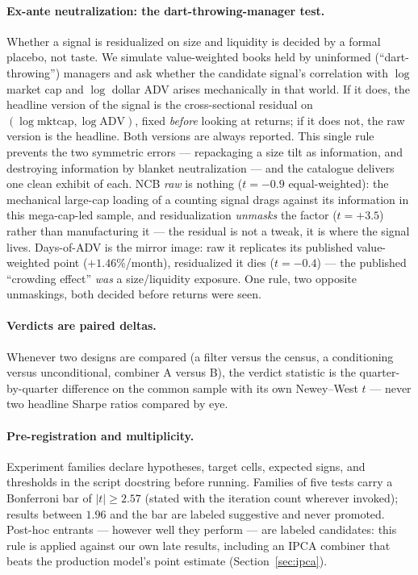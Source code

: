\paragraph{Ex-ante neutralization: the dart-throwing-manager test.}
Whether a signal is residualized on size and liquidity is decided by
a formal placebo, not taste. We simulate value-weighted books held by
uninformed (``dart-throwing'') managers and ask whether the candidate
signal's correlation with $\log$ market cap and $\log$ dollar ADV
arises mechanically in that world. If it does, the headline version
of the signal is the cross-sectional residual on
$(\log \mathrm{mktcap}, \log \mathrm{ADV})$, fixed \emph{before}
looking at returns; if it does not, the raw version is the headline.
Both versions are always reported. This single rule prevents the two
symmetric errors --- repackaging a size tilt as information, and
destroying information by blanket neutralization --- and the
catalogue delivers one clean exhibit of each. NCB \emph{raw} is
nothing ($t=-0.9$ equal-weighted): the mechanical large-cap loading
of a counting signal drags against its information in this
mega-cap-led sample, and residualization \emph{unmasks} the factor
($t=+3.5$) rather than manufacturing it --- the residual is not a
tweak, it is where the signal lives. Days-of-ADV is the mirror
image: raw it replicates its published value-weighted point
($+1.46\%$/month), residualized it dies ($t=-0.4$) --- the published
``crowding effect'' \emph{was} a size/liquidity exposure. One rule,
two opposite unmaskings, both decided before returns were seen.

\paragraph{Verdicts are paired deltas.}
Whenever two designs are compared (a filter versus the census, a
conditioning versus unconditional, combiner A versus B), the verdict
statistic is the quarter-by-quarter difference on the common sample
with its own Newey--West $t$ --- never two headline Sharpe ratios
compared by eye.

\paragraph{Pre-registration and multiplicity.}
Experiment families declare hypotheses, target cells, expected signs,
and thresholds in the script docstring before running. Families of
five tests carry a Bonferroni bar of $|t|\ge 2.57$ (stated with the
iteration count wherever invoked); results between $1.96$ and the bar
are labeled suggestive and never promoted. Post-hoc entrants ---
however well they perform --- are labeled candidates: this rule is
applied against our own late results, including an IPCA combiner that
beats the production model's point estimate
(Section~\ref{sec:ipca}).


